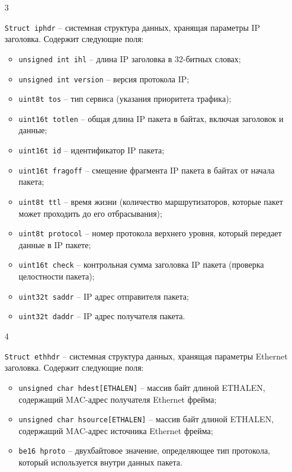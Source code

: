 \begin{enumerate}
    \item[3] {{\texttt{Struct iphdr}} -- системная структура данных, хранящая параметры IP
    заголовка. Содержит следующие поля:
        \begin{itemize}
            \item \texttt{unsigned int ihl} -- длина IP заголовка в 32-битных словах;
            \item \texttt{unsigned int version} -- версия протокола IP;
            \item \texttt{u{\textunderscore}int8{\textunderscore}t tos} -- тип сервиса (указания приоритета трафика);
            \item \texttt{u{\textunderscore}int16{\textunderscore}t tot{\textunderscore}len} -- общая длина IP пакета в байтах, включая
            заголовок и данные;
            \item \texttt{u{\textunderscore}int16{\textunderscore}t id} -- идентификатор IP пакета;
            \item \texttt{u{\textunderscore}int16{\textunderscore}t frag{\textunderscore}off} -- смещение фрагмента IP пакета в байтах от
            начала пакета;
            \item \texttt{u{\textunderscore}int8{\textunderscore}t ttl} -- время жизни (количество маршрутизаторов,
            которые пакет может проходить до его отбрасывания);
            \item \texttt{u{\textunderscore}int8{\textunderscore}t protocol} -- номер протокола верхнего уровня, который
            передает данные в IP пакете;
            \item \texttt{u{\textunderscore}int16{\textunderscore}t check} -- контрольная сумма заголовка IP пакета
            (проверка целостности пакета);
            \item \texttt{u{\textunderscore}int32{\textunderscore}t saddr} -- IP адрес отправителя пакета;
            \item \texttt{u{\textunderscore}int32{\textunderscore}t daddr} -- IP адрес получателя пакета.
        \end{itemize}}

    \item[4] {{\texttt{Struct ethhdr}} -- системная структура данных, хранящая параметры
    Ethernet заголовка. Содержит следующие поля:
        \begin{itemize}
            \item \texttt{unsigned char h{\textunderscore}dest[ETH{\textunderscore}ALEN]} -- массив байт длиной
            ETH{\textunderscore}ALEN\cite{unix_prof}, содержащий MAC-адрес получателя Ethernet фрейма;
            \item \texttt{unsigned char h{\textunderscore}source[ETH{\textunderscore}ALEN]} -- массив байт длиной
            ETH{\textunderscore}ALEN, содержащий MAC-адрес источника Ethernet фрейма;
            \item \texttt{be16 h{\textunderscore}proto} -- двухбайтовое значение, определяющее тип
            протокола, который используется внутри данных пакета.
        \end{itemize}}


\end{enumerate}
